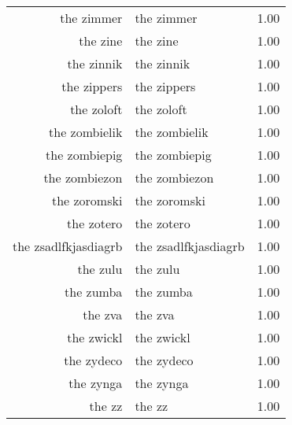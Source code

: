 \begin{table}[ht]
\begin{tabular}{rlr}
  the zimmer & the zimmer & 1.00 \\ 
  the zine & the zine & 1.00 \\ 
  the zinnik & the zinnik & 1.00 \\ 
  the zippers & the zippers & 1.00 \\ 
  the zoloft & the zoloft & 1.00 \\ 
  the zombielik & the zombielik & 1.00 \\ 
  the zombiepig & the zombiepig & 1.00 \\ 
  the zombiezon & the zombiezon & 1.00 \\ 
  the zoromski & the zoromski & 1.00 \\ 
  the zotero & the zotero & 1.00 \\ 
  the zsadlfkjasdiagrb & the zsadlfkjasdiagrb & 1.00 \\ 
  the zulu & the zulu & 1.00 \\ 
  the zumba & the zumba & 1.00 \\ 
  the zva & the zva & 1.00 \\ 
  the zwickl & the zwickl & 1.00 \\ 
  the zydeco & the zydeco & 1.00 \\ 
  the zynga & the zynga & 1.00 \\ 
  the zz & the zz & 1.00 \\ 
   \hline
\end{tabular}
\end{table}
